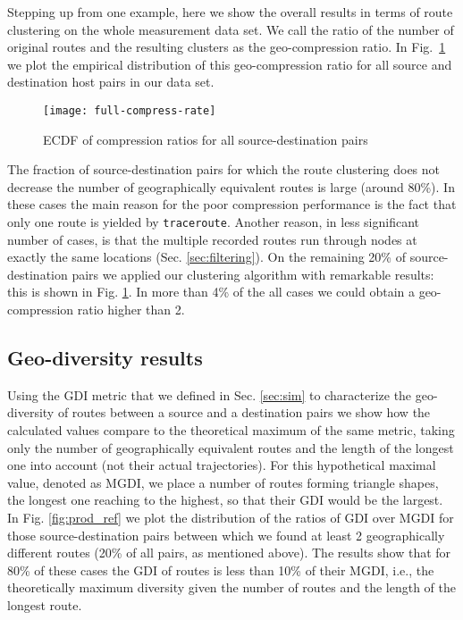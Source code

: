 \documentclass[peerreview]{IEEEtran}
\begin{document}
Stepping up from one example, here we show the overall results in terms of route
clustering on the whole measurement data set. We call the ratio of the number of
original routes and the resulting clusters as the geo-compression ratio. In
Fig.~\ref{fig:compression_all} we plot the empirical distribution of this
geo-compression ratio for all source and destination host pairs in our data set.
  
\begin{figure}[h]
	\centering
	\texttt{[image: full-compress-rate]}
	\caption{ECDF of compression ratios for all source-destination pairs}
	\label{fig:compression_all}
\end{figure}

The fraction of source-destination pairs for which the route clustering does not
decrease the number of geographically equivalent routes is large (around 80\%).
In these cases the main reason for the poor compression performance is the fact
that only one route is yielded by \texttt{traceroute}. Another reason, in less
significant number of cases, is that the multiple recorded routes run through
nodes at exactly the same locations (Sec. \ref{sec:filtering}). On the remaining
20\% of source-destination pairs we applied our clustering algorithm with
remarkable results: this is shown in Fig. \ref{fig:compression_all}. In more
than 4\% of the all cases we could obtain a geo-compression ratio higher than 2.

\subsection{Geo-diversity results}

Using the GDI metric that we defined in Sec. \ref{sec:sim} to characterize the
geo-diversity of routes between a source and a destination pairs we show how the
calculated values compare to the theoretical maximum of the same metric, taking
only the number of geographically equivalent routes and the length of the
longest one into account (not their actual trajectories). For this hypothetical
maximal value, denoted as MGDI, we place a number of routes forming triangle
shapes, the longest one reaching to the highest, so that their GDI would be the
largest. In Fig. \ref{fig:prod_ref} we plot the distribution of the ratios of
GDI over MGDI for those source-destination pairs between which we found at least
2 geographically different routes (20\% of all pairs, as mentioned above). The
results show that for 80\% of these cases the GDI of routes is less than 10\% of
their MGDI, i.e., the theoretically maximum diversity given the number of routes
and the length of the longest route.
\end{document}
